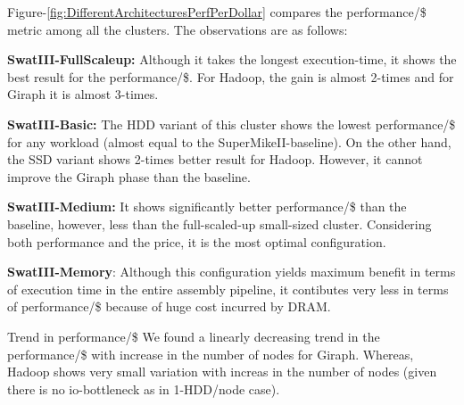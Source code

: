 \documentclass[conference]{IEEEtran}
\begin{document}
Figure-\ref{fig:DifferentArchitecturesPerfPerDollar} compares the performance/\$ metric among all the clusters.
The observations are as follows:
\begin{inparaenum}[\itshape 1\upshape)]
\item \textbf{SwatIII-FullScaleup:} Although it takes the longest execution-time, it shows the best result for the performance/\$. For Hadoop, the gain is almost 2-times and for Giraph it is almost 3-times.
\item \textbf{SwatIII-Basic:} The HDD variant of this cluster shows the lowest performance/\$ for any workload (almost equal to the SuperMikeII-baseline). On the other hand, the SSD variant shows 2-times better result for Hadoop. However, it cannot improve the Giraph phase than the baseline.
\item \textbf{SwatIII-Medium:} It shows significantly better performance/\$ than the baseline, however, less than the full-scaled-up small-sized cluster. Considering both performance and the price, it is the most optimal configuration.
\item \textbf{SwatIII-Memory}: Although this configuration yields maximum benefit in terms of execution time in the entire assembly pipeline, it contibutes very less in terms of performance/\$ because of huge cost incurred by DRAM. %
\item {Trend in performance/\$} We found a linearly decreasing trend in the performance/\$  with increase in the number of nodes for Giraph. Whereas, Hadoop shows very small variation with increas in the number of nodes (given there is no io-bottleneck as in 1-HDD/node case).
\end{inparaenum}
\end{document}
